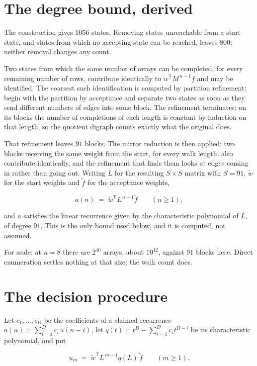 \documentclass[11pt]{article}
\theoremstyle{definition}
\begin{document}
\section{The degree bound, derived}

The construction gives $1056$ states. Removing states unreachable from a start state, and states from which no accepting state can be reached, leaves $800$; neither removal changes any count.

Two states from which the same number of arrays can be completed, for every remaining number of rows, contribute identically to $w^{\mathsf T}M^{\,n-1}f$ and may be identified. The coarsest such identification is computed by partition refinement: begin with the partition by acceptance and separate two states as soon as they send different numbers of edges into some block. The refinement terminates; on its blocks the number of completions of each length is constant by induction on that length, so the quotient digraph counts exactly what the original does.

That refinement leaves $91$ blocks. The mirror reduction is then applied: two blocks receiving the same weight from the start, for every walk length, also contribute identically, and the refinement that finds them looks at edges coming in rather than going out. Writing $L$ for the resulting $S \times S$ matrix with $S = 91$, $\tilde w$ for the start weights and $\tilde f$ for the acceptance weights,

\[a(n) \;=\; \tilde w^{\mathsf T} L^{\,n-1} \tilde f \qquad (n \ge 1),\]

and $a$ satisfies the linear recurrence given by the characteristic polynomial of $L$, of degree $91$. This is the only bound used below, and it is computed, not assumed.

For scale: at $n = 8$ there are $2^{40}$ arrays, about $10^{12}$, against $91$ blocks here. Direct enumeration settles nothing at that size; the walk count does.

\section{The decision procedure}

Let $c_1,\dots,c_D$ be the coefficients of a claimed recurrence $a(n) = \sum_{i=1}^{D} c_i\,a(n-i)$, let $q(t) = t^{D} - \sum_{i=1}^{D} c_i t^{D-i}$ be its characteristic polynomial, and put

\[u_m \;=\; \tilde w^{\mathsf T} L^{\,m-1} q(L)\,\tilde f \qquad (m \ge 1).\]
\end{document}

